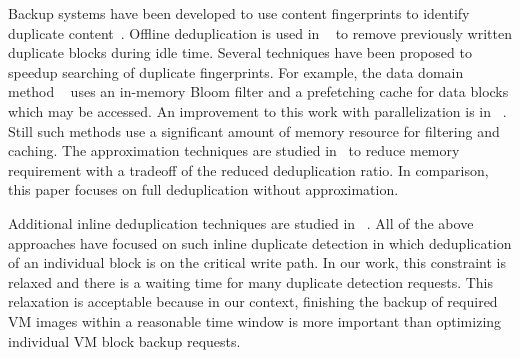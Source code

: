 Backup systems have been developed to use content fingerprints to identify duplicate
content~\cite{venti02,Rhea2008}.
Offline deduplication is used in ~\cite{EMC,NetAppOffline} to remove previously written duplicate blocks during idle time.
Several techniques have been proposed to speedup searching of duplicate
fingerprints. For example, the data domain method ~\cite{bottleneck08} 
uses  an in-memory Bloom filter and a prefetching cache for data blocks  which may be
accessed.  An improvement to this work with parallelization is in ~\cite{MAD210,DEBAR}.
Still such methods use  a significant amount of memory resource for filtering and caching.
The approximation techniques are studied in~\cite{extreme_binning09,WeiZhangIEEE}  
to reduce memory requirement with a tradeoff of the reduced deduplication ratio.
In comparison, this paper focuses on  full deduplication without approximation.

Additional inline deduplication techniques are studied in ~\cite{sparseindex09,Guo2011,idedup}. 
All of the above approaches have focused on
such inline duplicate detection in which  deduplication of an individual block  is on the critical write path.
In our work, this constraint is relaxed and 
there is a waiting time for many duplicate detection requests. This relaxation is acceptable because 
in our context, finishing the backup of required VM images within a reasonable time window is more
important than optimizing individual VM block  backup requests.

  
